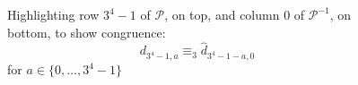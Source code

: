 
\begin{figure}[p]

    \noindent{}

    \vskip2cm

    \noindent{}

    \captionsetup{singlelinecheck=off}
    \caption[$\mathcal{P}$'s row $3^{4}-1$ and $\mathcal{P}^{-1}$'s column $0$ ]
        { Highlighting row $3^{4}-1$ of $\mathcal{P}$, on top, and column $0$ of $\mathcal{P}^{-1}$, on bottom,
            to show congruence: 
            \begin{displaymath}
                d_{3^4 -1,a} \equiv_{3} \hat{d}_{3^4 -1-a,0} 
            \end{displaymath}
            for $a\in\lbrace0,\ldots,3^{4}-1\rbrace$ 
        }


    \label{fig:pascal:standard:mod3:congruence:zero:row:above}

\end{figure}
